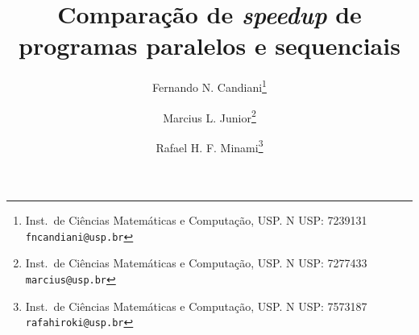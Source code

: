 \documentclass[11pt,twoside]{article}
\begin{document}
% 

%



\TRMakeCover


%
\pagestyle{myheadings}
\thispagestyle{empty}

%
\title{Comparação de \textit{speedup} de programas paralelos e sequenciais}

\author{Fernando N. Candiani\thanks{Inst.~de Ciências Matemáticas e Computação, USP. N USP: 7239131 \texttt{fncandiani@usp.br}} \and
Marcius L. Junior\thanks{Inst.~de Ciências Matemáticas e Computação, USP. N USP: 7277433 \texttt{marcius@usp.br}} \and
Rafael H. F. Minami\thanks{Inst.~de Ciências Matemáticas e Computação, USP. N USP: 7573187 \texttt{rafahiroki@usp.br}}}

\date{}

\maketitle
\end{document}
